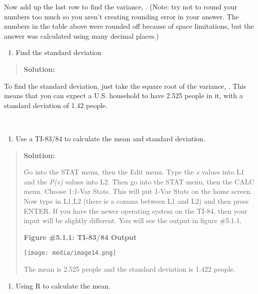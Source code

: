 \documentclass[]{book}
\providecommand{\tightlist}{%
  \setlength{\itemsep}{0pt}\setlength{\parskip}{0pt}}
\begin{document}
Now add up the last row to find the variance, . (Note: try not to round
your numbers too much so you aren't creating rounding error in your
answer. The numbers in the table above were rounded off because of space
limitations, but the answer was calculated using many decimal places.)

\begin{enumerate}
\def\labelenumi{\alph{enumi}.}
\setcounter{enumi}{2}
\tightlist
\item
  Find the standard deviation
\end{enumerate}

\begin{quote}
\textbf{Solution:}
\end{quote}

To find the standard deviation, just take the square root of the
variance, . This means that you can expect a U.S. household to have
2.525 people in it, with a standard deviation of 1.42 people.

\textbf{\\
}

\begin{enumerate}
\def\labelenumi{\alph{enumi}.}
\setcounter{enumi}{3}
\tightlist
\item
  Use a TI-83/84 to calculate the mean and standard deviation.
\end{enumerate}

\begin{quote}
\textbf{Solution:}

Go into the STAT menu, then the Edit menu. Type the \emph{x} values into L1
and the \emph{P(x)} values into L2. Then go into the STAT menu, then the
CALC menu. Choose 1:1-Var Stats. This will put 1-Var Stats on the home
screen. Now type in L1,L2 (there is a comma between L1 and L2) and
then press ENTER. If you have the newer operating system on the TI-84,
then your input will be slightly different. You will see the output in
figure \#5.1.1.

\textbf{Figure \#5.1.1: TI-83/84 Output}

\texttt{[image: media/image14.png]}

The mean is 2.525 people and the standard deviation is 1.422 people.
\end{quote}

\begin{enumerate}
\def\labelenumi{\alph{enumi}.}
\setcounter{enumi}{4}
\tightlist
\item
  Using R to calculate the mean.
\end{enumerate}
\end{document}
